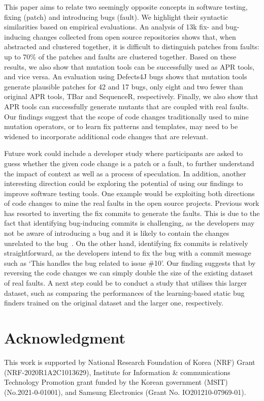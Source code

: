 \documentclass[conference]{IEEEtran}
\def\d4j{Defects4J\xspace}
\begin{document}
This paper aims to relate two seemingly opposite concepts in software testing,
fixing (patch) and introducing bugs (fault). We highlight their syntactic
similarities based on empirical evaluations. An analysis of 13k fix- and
bug-inducing changes collected from open source repositories shows that, when
abstracted and clustered together, it is difficult to distinguish patches from
faults: up to 70\% of the patches and faults are clustered together. Based on
these results, we also show that mutation tools can be successfully used as APR
tools, and vice versa. An evaluation using \d4j bugs shows that mutation tools
generate plausible patches for 42 and 17 bugs, only eight and two fewer than
original APR tools, TBar and SequenceR, respectively. Finally, we also show that
APR tools can successfully generate mutants that are coupled with real faults.
Our findings suggest that the scope of code changes traditionally used to mine
mutation operators, or to learn fix patterns and templates, may need to be
widened to incorporate additional code changes that are relevant.

Future work could include a developer study where participants are asked to guess
whether the given code change is a patch or a fault, to further understand the
impact of context as well as a process of speculation. In addition, another
interesting direction could be exploring the potential of using our findings to
improve software testing tools. One example would be exploiting both directions
of code changes to mine the real faults in the open source projects. Previous
work has resorted to inverting the fix commits to generate the faults. This is
due to the fact that identifying bug-inducing commits is challenging, as the
developers may not be aware of introducing a bug and it is likely to contain the
changes unrelated to the bug~\cite{wen2019exploring, An2021qb}. On the other
hand, identifying fix commits is relatively straightforward, as the developers
intend to fix the bug with a commit message such as `This handles the bug
related to issue \#10'. Our finding suggests that by reversing the code changes
we can simply double the size of the existing dataset of real faults. A next
step could be to conduct a study that utilises this larger dataset, such as
comparing the performances of the learning-based static bug finders trained on
the original dataset and the larger one, respectively.

\section*{Acknowledgment}

This work is supported by National Research Foundation of Korea
(NRF) Grant (NRF-2020R1A2C1013629), Institute for Information \& communications
Technology Promotion grant funded by the Korean government (MSIT)
(No.2021-0-01001), and Samsung Electronics (Grant No. IO201210-07969-01). 

\newpage




\balance
\end{document}
